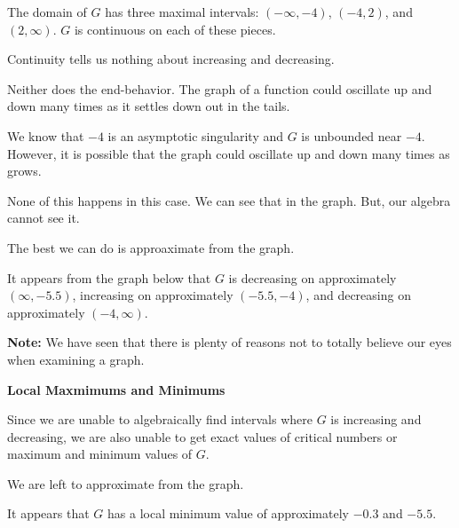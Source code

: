 \documentclass{ximera}
\begin{document}
\begin{explanation}



The domain of $G$ has three maximal intervals: $(-\infty,-4)$, $(-4,2)$, and $(2,\infty)$.  $G$ is continuous on each of these pieces.



Continuity tells us nothing about increasing and decreasing.


Neither does the end-behavior. The graph of a function could oscillate up and down many times as it settles down out in the tails.


We know that $-4$ is an asymptotic singularity and $G$ is unbounded near $-4$.  However, it is possible that the graph could oscillate up and down many times as grows.


None of this happens in this case.  We can see that in the graph.  But, our algebra cannot see it.



The best we can do is approaximate from the graph.

It appears from the graph below that $G$ is decreasing on approximately $(\infty, -5.5)$, increasing on approximately $(-5.5, -4)$, and decreasing on approximately $(-4, \infty)$.

\textbf{Note:} We have seen that there is plenty of reasons not to totally believe our eyes when examining a graph.



\end{explanation}
















\textbf{\textcolor{purple!85!blue}{Local Maxmimums and Minimums}} 

\begin{explanation}


Since we are unable to algebraically find intervals where $G$ is increasing and decreasing, we are also unable to get exact values of critical numbers or maximum and minimum values of $G$.


We are left to approximate from the graph.

It appears that $G$ has a local minimum value of approximately $-0.3$ and $-5.5$.


\end{explanation}
\end{document}
